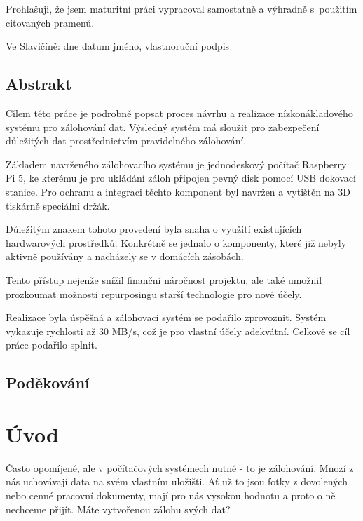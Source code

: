 \documentclass[a4paper,12pt, oneside]{book}
\begin{document}
\newpage
\mbox{}
\newpage


\noindent
Prohlašuji, že jsem maturitní práci vypracoval samostatně
a výhradně s použitím citovaných pramenů.

Ve Slavičíně: dne datum jméno, vlastnoruční podpis


\newpage
\section*{Abstrakt}

Cílem této práce je podrobně popsat proces návrhu a realizace nízkonákladového
systému pro zálohování dat.  Výsledný systém má sloužit pro zabezpečení důležitých
dat prostřednictvím pravidelného zálohování.

Základem navrženého zálohovacího systému je jednodeskový počítač Raspberry Pi 5,
ke kterému je pro ukládání záloh připojen pevný disk pomocí USB
dokovací stanice. Pro ochranu a integraci těchto komponent byl navržen a
vytištěn na 3D tiskárně speciální držák. 

Důležitým znakem tohoto provedení byla snaha o využití existujících
hardwarových prostředků. Konkrétně se jednalo o komponenty, které již nebyly
aktivně používány a nacházely se v domácích zásobách.

Tento přístup nejenže snížil finanční náročnost projektu, ale také umožnil
prozkoumat možnosti repurposingu starší technologie pro nové účely.

Realizace byla úspěšná a zálohovací systém se podařilo zprovoznit. Systém
vykazuje rychlosti až 30 MB/s, což je pro vlastní účely adekvátní. Celkově 
se cíl práce podařilo splnit.

\newpage
\section*{Poděkování}

\tableofcontents

\clearpage

\chapter{Úvod}

Často opomíjené, ale v počítačových systémech nutné - to je zálohování.
Mnozí z nás uchovávají data na svém vlastním uložišti. Ať už to jsou
fotky z dovolených nebo cenné pracovní dokumenty, mají pro nás vysokou hodnotu
a proto o ně nechceme přijít. Máte vytvořenou zálohu svých dat? 
\end{document}
